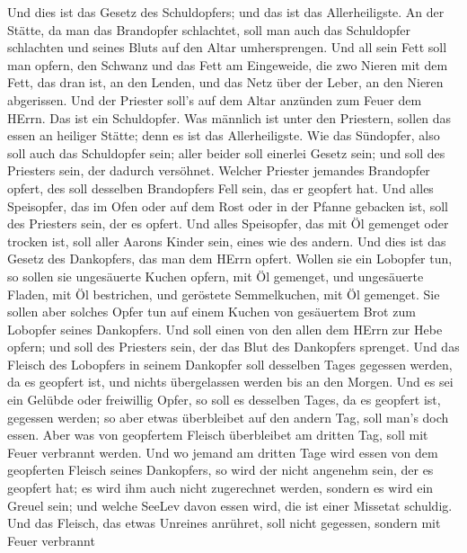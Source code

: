  Und dies ist das Gesetz des Schuldopfers; und das ist das
Allerheiligste.  An der Stätte, da man das Brandopfer
schlachtet, soll man auch das Schuldopfer schlachten und seines Bluts
auf den Altar umhersprengen.  Und all sein Fett soll man
opfern, den Schwanz und das Fett am Eingeweide,  die zwo
Nieren mit dem Fett, das dran ist, an den Lenden, und das Netz über der
Leber, an den Nieren abgerissen.  Und der Priester soll's
auf dem Altar anzünden zum Feuer dem HErrn. Das ist ein Schuldopfer.
 Was männlich ist unter den Priestern, sollen das essen an
heiliger Stätte; denn es ist das Allerheiligste.  Wie das
Sündopfer, also soll auch das Schuldopfer sein; aller beider soll
einerlei Gesetz sein; und soll des Priesters sein, der dadurch
versöhnet.  Welcher Priester jemandes Brandopfer opfert, des
soll desselben Brandopfers Fell sein, das er geopfert hat. 
Und alles Speisopfer, das im Ofen oder auf dem Rost oder in der Pfanne
gebacken ist, soll des Priesters sein, der es opfert.  Und
alles Speisopfer, das mit Öl gemenget oder trocken ist, soll aller
Aarons Kinder sein, eines wie des andern.  Und dies ist das
Gesetz des Dankopfers, das man dem HErrn opfert.  Wollen
sie ein Lobopfer tun, so sollen sie ungesäuerte Kuchen opfern, mit Öl
gemenget, und ungesäuerte Fladen, mit Öl bestrichen, und geröstete
Semmelkuchen, mit Öl gemenget.  Sie sollen aber solches
Opfer tun auf einem Kuchen von gesäuertem Brot zum Lobopfer seines
Dankopfers.  Und soll einen von den allen dem HErrn zur
Hebe opfern; und soll des Priesters sein, der das Blut des Dankopfers
sprenget.  Und das Fleisch des Lobopfers in seinem
Dankopfer soll desselben Tages gegessen werden, da es geopfert ist, und
nichts übergelassen werden bis an den Morgen.  Und es sei
ein Gelübde oder freiwillig Opfer, so soll es desselben Tages, da es
geopfert ist, gegessen werden; so aber etwas überbleibet auf den andern
Tag, soll man's doch essen.  Aber was von geopfertem
Fleisch überbleibet am dritten Tag, soll mit Feuer verbrannt werden.
 Und wo jemand am dritten Tage wird essen von dem
geopferten Fleisch seines Dankopfers, so wird der nicht angenehm sein,
der es geopfert hat; es wird ihm auch nicht zugerechnet werden, sondern
es wird ein Greuel sein; und welche SeeLev davon essen wird, die ist
einer Missetat schuldig.  Und das Fleisch, das etwas
Unreines anrühret, soll nicht gegessen, sondern mit Feuer verbrannt
